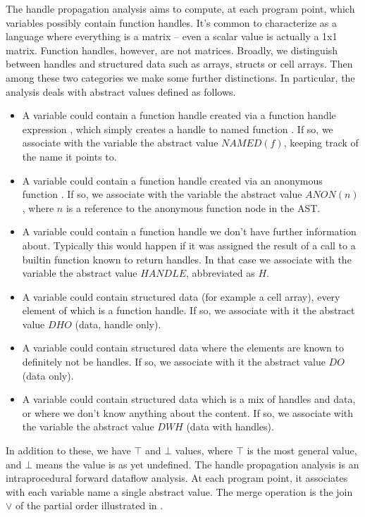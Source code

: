 The handle propagation analysis aims to compute, at each program point, which
variables possibly contain function handles. It's common to characterize
\matlab as a language where everything is a matrix -- even a scalar value is
actually a 1x1 matrix. Function handles, however, are not matrices. Broadly,
we distinguish between handles and structured data such as arrays, structs
or cell arrays. Then among these two categories we make some further
distinctions. In particular, the analysis deals with abstract values defined
as follows.

\begin{itemize}
  \item A variable could contain a function handle created via a function
    handle expression , which simply creates a handle to named
    function . If so, we associate with the variable the abstract value
    $NAMED(f)$, keeping track of the name it points to.
  \item A variable could contain a function handle created via an anonymous
    function . If so, we associate with the variable the
    abstract value $ANON(n)$, where $n$ is a reference to the
    anonymous function node in the AST.
  \item A variable could contain a function handle we don't have further
    information about. Typically this would happen if it was assigned the
    result of a call to a builtin function known to return handles. In that
    case we associate with the variable the abstract value $HANDLE$,
    abbreviated as $H$.
  \item A variable could contain structured data (for example a cell array),
    every element of which is a function handle. If so, we associate with it
    the abstract value $DHO$ (data, handle only).
  \item A variable could contain structured data where the elements are known
    to definitely not be handles. If so, we associate with it the abstract
    value $DO$ (data only).
  \item A variable could contain structured data which is a mix of handles
    and data, or where we don't know anything about the content. If so, we
    associate with the variable the abstract value $DWH$ (data with handles).
\end{itemize}

In addition to these, we have $\top$ and $\bot$ values, where $\top$ is the
most general value, and $\bot$ means the value is as yet undefined. The handle
propagation analysis is an intraprocedural forward dataflow analysis. At each
program point, it associates with each variable name a single abstract value.
The merge operation is the join $\vee$ of the partial order illustrated in
.

